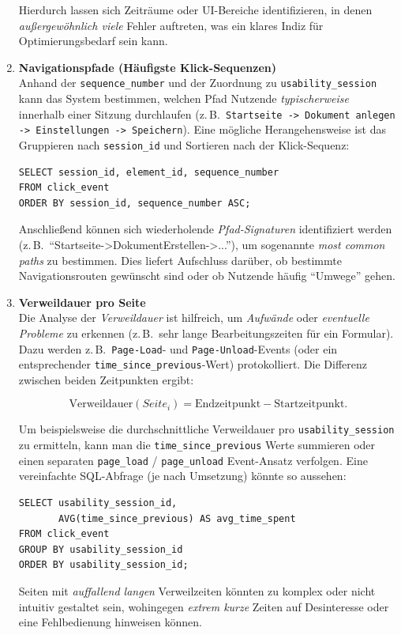 \documentclass[12pt,oneside]{article}
\begin{document}
\begin{enumerate}
    Hierdurch lassen sich Zeiträume oder UI-Bereiche identifizieren, in denen \emph{außergewöhnlich viele} Fehler auftreten, was ein klares Indiz für Optimierungsbedarf sein kann.

    \item \textbf{Navigationspfade (Häufigste Klick-Sequenzen)}\\
    Anhand der \lstinline|sequence_number| und der Zuordnung zu \lstinline|usability_session| kann das System bestimmen, welchen Pfad Nutzende \emph{typischerweise} innerhalb einer Sitzung durchlaufen (z.\,B.\ \texttt{Startseite -> Dokument anlegen -> Einstellungen -> Speichern}). Eine mögliche Herangehensweise ist das Gruppieren nach \lstinline|session_id| und Sortieren nach der Klick-Sequenz:

    \begin{lstlisting}[style=sql,caption={Beispiel: Pfadrekonstruktion je Session}]
SELECT session_id, element_id, sequence_number
FROM click_event
ORDER BY session_id, sequence_number ASC;
    \end{lstlisting}

    Anschließend können sich wiederholende \emph{Pfad-Signaturen} identifiziert werden (z.\,B.\ \enquote{Startseite->DokumentErstellen->...}), um sogenannte \emph{most common paths} zu bestimmen. Dies liefert Aufschluss darüber, ob bestimmte Navigationsrouten gewünscht sind oder ob Nutzende häufig \enquote{Umwege} gehen.

    \item \textbf{Verweildauer pro Seite}\\
    Die Analyse der \emph{Verweildauer} ist hilfreich, um \emph{Aufwände} oder \emph{eventuelle Probleme} zu erkennen (z.\,B.\ sehr lange Bearbeitungszeiten für ein Formular). Dazu werden z.\,B.\ \texttt{Page-Load}- und \texttt{Page-Unload}-Events (oder ein entsprechender \texttt{time\_since\_previous}-Wert) protokolliert. Die Differenz zwischen beiden Zeitpunkten ergibt:

    \[
    \text{Verweildauer}(Seite_i) = \text{Endzeitpunkt} - \text{Startzeitpunkt}.
    \]

    Um beispielsweise die durchschnittliche Verweildauer pro \texttt{usability\_session} zu ermitteln, kann man die \lstinline|time_since_previous| Werte summieren oder einen separaten \lstinline|page_load| / \lstinline|page_unload| Event-Ansatz verfolgen. Eine vereinfachte SQL-Abfrage (je nach Umsetzung) könnte so aussehen:

    \begin{lstlisting}[style=sql,caption={Beispiel: Durchschnittliche Verweildauer je Session}]
SELECT usability_session_id,
       AVG(time_since_previous) AS avg_time_spent
FROM click_event
GROUP BY usability_session_id
ORDER BY usability_session_id;
    \end{lstlisting}

    Seiten mit \emph{auffallend langen} Verweilzeiten könnten zu komplex oder nicht intuitiv gestaltet sein, wohingegen \emph{extrem kurze} Zeiten auf Desinteresse oder eine Fehlbedienung hinweisen können.
\end{enumerate}
\end{document}
